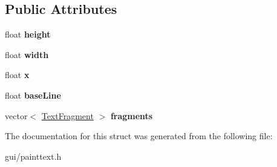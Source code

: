 \subsection*{Public Attributes}
\begin{DoxyCompactItemize}
\item 
float {\bfseries height}\hypertarget{structPaintText_1_1TextLine_a284c2270ba0ffbd8008be4d49919edf2}{}\label{structPaintText_1_1TextLine_a284c2270ba0ffbd8008be4d49919edf2}

\item 
float {\bfseries width}\hypertarget{structPaintText_1_1TextLine_ab35df7c1807979df0199f0ec139da506}{}\label{structPaintText_1_1TextLine_ab35df7c1807979df0199f0ec139da506}

\item 
float {\bfseries x}\hypertarget{structPaintText_1_1TextLine_ae2e0ef009c1a2ddd1316b17271d3972e}{}\label{structPaintText_1_1TextLine_ae2e0ef009c1a2ddd1316b17271d3972e}

\item 
float {\bfseries base\+Line}\hypertarget{structPaintText_1_1TextLine_a86dbbbe5edd01fa31e78d46a75775038}{}\label{structPaintText_1_1TextLine_a86dbbbe5edd01fa31e78d46a75775038}

\item 
vector$<$ \hyperlink{structPaintText_1_1TextFragment}{Text\+Fragment} $>$ {\bfseries fragments}\hypertarget{structPaintText_1_1TextLine_a056c95384e53b33f02358c7ceb216f65}{}\label{structPaintText_1_1TextLine_a056c95384e53b33f02358c7ceb216f65}

\end{DoxyCompactItemize}


The documentation for this struct was generated from the following file\+:\begin{DoxyCompactItemize}
\item 
gui/painttext.\+h\end{DoxyCompactItemize}
